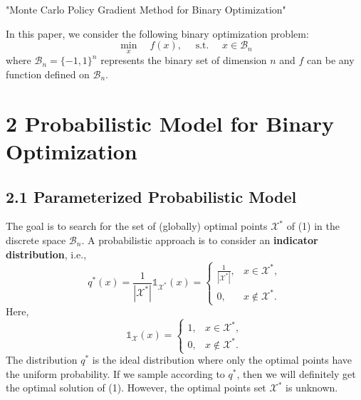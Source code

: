 "Monte Carlo Policy Gradient Method for Binary Optimization"

In this paper, we consider the following binary optimization problem:
\begin{equation}
    \min _{x} \quad f(x), \quad \text { s.t. } \quad x \in \mathcal{B}_{n} \tag{1}
\end{equation}
where $\mathcal{B}_{n}=\{-1,1\}^{n}$ represents the binary set of dimension $n$ and $f$ can be any function defined on $\mathcal{B}_{n}$.

\section{2 Probabilistic Model for Binary Optimization}

\subsection{2.1 Parameterized Probabilistic Model}

The goal is to search for the set of (globally) optimal points $\mathcal{X}^{*}$ of (1) in the discrete space $\mathcal{B}_{n}$. A probabilistic approach is to consider an \textbf{indicator distribution}, i.e.,
\begin{equation}
    q^{*}(x)=\frac{1}{\left|\mathcal{X}^{*}\right|} \mathbb{1}_{\mathcal{X}^{*}}(x)= 
\begin{cases}\frac{1}{\left|\mathcal{X}^{*}\right|}, & x \in \mathcal{X}^{*}, \\ 0, & x \notin \mathcal{X}^{*}.
\end{cases}
\end{equation}
Here,
\begin{equation}
    \mathbb{1}_{\mathcal{X}}(x)= \begin{cases}1, & x \in \mathcal{X}^*, \\ 0, & x \notin \mathcal{X}^* .\end{cases}
\end{equation}
The distribution $q^{*}$ is the ideal distribution where only the optimal points have the uniform probability. If we sample according to $q^{*}$, then we will definitely get the optimal solution of (1). However, the optimal points set $\mathcal{X}^{*}$ is unknown. 

